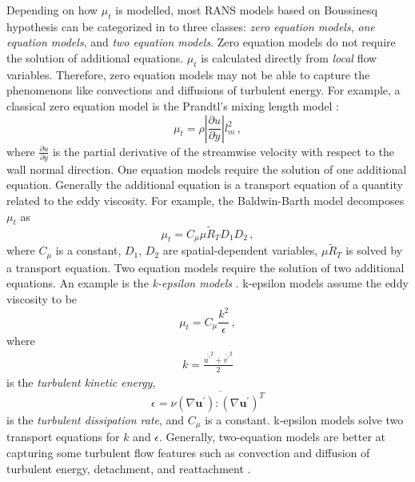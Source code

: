\documentclass[a4paper,onecolumn]{article}
\theoremstyle{remark}
\begin{document}
\noindent Depending on how $\mu_t$ is modelled, most RANS models based
on Boussinesq hypothesis can be categorized in to three classes:
\emph{zero equation models}, \emph{one equation models}, and \emph{two equation models}.
Zero equation models do not require the solution of additional equations.
$\mu_t$ is calculated directly from \emph{local} flow variables. Therefore, zero
equation models may not be able to capture the phenomenons like convections and diffusions
of turbulent energy.
For example, a classical zero equation model is the Prandtl's mixing length model 
\cite{Wilcox CFD}:
\begin{equation}
    \mu_t = \rho \left| \frac{\partial u}{\partial y} \right| l_m^2\,,
    \label{Prandtl mixing length}
\end{equation}
where $\frac{\partial u}{\partial y}$ is the partial derivative of the streamwise velocity
with respect to the wall normal direction.
One equation models require the solution of one additional equation. Generally the additional
equation is a transport equation of a quantity related to the eddy viscosity.
For example, the Baldwin-Barth model \cite{Wilcox CFD} decomposes $\mu_t$ as
\begin{equation}
    \mu_t =  C_\mu\mu \tilde{R}_T D_1 D_2\,,
\end{equation}
where $C_\mu$ is a constant, $D_1$, $D_2$ are spatial-dependent variables, $\mu \tilde{R}_T$
is solved by a transport equation.
Two equation models require the solution of two additional equations. 
An example is the \emph{k-epsilon models}
\cite{Wilcox CFD}.
k-epsilon models assume the eddy viscosity to be
\begin{equation}
    \mu_t = C_\mu \frac{k^2}{\epsilon}\,,
\end{equation}
where
\begin{equation}\begin{split}
    k = \frac{\bar{u^\prime}^2 + \bar{v^\prime}^2 }{2}
\end{split}\end{equation}
is the \emph{turbulent kinetic energy},
\begin{equation}
    \epsilon = \nu \overline{ 
    \left(\nabla\mathbf{u}^\prime\right) :\left( \nabla\mathbf{u}^\prime \right)^T}
\end{equation}
is the \emph{turbulent dissipation rate}, 
and $C_\mu$ is a constant.
k-epsilon models solve two transport equations for $k$ and $\epsilon$.
Generally, two-equation models are better at capturing some turbulent flow features
such as convection and diffusion of turbulent energy, detachment, and reattachment
\cite{Wilcox CFD}.
\\
\end{document}
